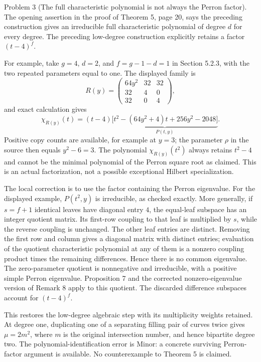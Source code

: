 \documentclass[10pt]{article}
\begin{document}
Problem 3 (The full characteristic polynomial is not always the Perron factor).  The opening assertion in the proof of Theorem 5, page 20, says the preceding construction gives an irreducible full characteristic polynomial of degree \(d\) for every degree. The preceding low-degree construction explicitly retains a factor \((t-4)^f\).\par
For example, take \(g=4\), \(d=2\), and \(f=g-1-d=1\) in Section 5.2.3, with the two repeated parameters equal to one. The displayed family is \[R(y)=\begin{pmatrix}64y^2&32&32\\32&4&0\\32&0&4\end{pmatrix},\] and exact calculation gives \[\chi_{R(y)}(t)
 =(t-4)\underbrace{\bigl[t^2-(64y^2+4)t+256y^2-2048\bigr]}_{P(t,y)}.\] Positive copy counts are available, for example at \(y=3\); the parameter \(\rho\) in the source then equals \(y^2-6=3\). The polynomial \(\chi_{R(y)}(t^2)\) always retains \(t^2-4\) and cannot be the minimal polynomial of the Perron square root as claimed. This is an actual factorization, not a possible exceptional Hilbert specialization.\par
The local correction is to use the factor containing the Perron eigenvalue. For the displayed example, \(P(t^2,y)\) is irreducible, as checked exactly. More generally, if \(s=f+1\) identical leaves have diagonal entry \(4\), the equal-leaf subspace has an integer quotient matrix. Its first-row coupling to that leaf is multiplied by \(s\), while the reverse coupling is unchanged. The other leaf entries are distinct. Removing the first row and column gives a diagonal matrix with distinct entries; evaluation of the quotient characteristic polynomial at any of them is a nonzero coupling product times the remaining differences. Hence there is no common eigenvalue. The zero-parameter quotient is nonnegative and irreducible, with a positive simple Perron eigenvalue. Proposition 7 and the corrected nonzero-eigenvalue version of Remark 8 apply to this quotient. The discarded difference subspaces account for \((t-4)^f\).\par
This restores the low-degree algebraic step with its multiplicity weights retained. At degree one, duplicating one of a separating filling pair of curves twice gives \(\mu=2m^2\), where \(m\) is the original intersection number, and hence bipartite degree two. The polynomial-identification error is Minor: a concrete surviving Perron-factor argument is available. No counterexample to Theorem 5 is claimed.\par
\end{document}
